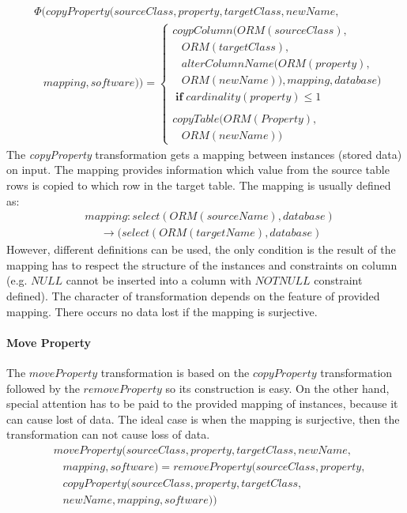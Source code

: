 \documentclass[runningheads]{comsis}
\begin{document}
\begin{align}
& \Phi(copyProperty(sourceClass, property, targetClass, newName, \nonumber \\ 
&  \; \; \; mapping, software)) = \begin{cases}
 coypColumn(ORM(sourceClass),  \\ \;\;\; ORM(targetClass),  \\ \;\;\;alterColumnName(ORM(property), \\ \;\;\; ORM(newName)), mapping, database) \\ \; \mathbf{if} \; cardinality(property) \leq 1 \\\\
 copyTable(ORM(Property), \\ \;\;\; ORM(newName))
 \end{cases}
\end{align}
The \emph{copyProperty} transformation gets a mapping between instances (stored data) on input. The mapping provides information which value from the source table rows is copied to which row in the target table. The mapping is usually defined as: 
\begin{align}\label{eq:mapping}
&	mapping : select(ORM(sourceName), database) \nonumber \\ 
& \;\;\;\;\; \rightarrow  (select(ORM(targetName), database) 
\end{align}
However, different definitions can be used, the only condition is the result of the mapping has to respect the structure of the instances and constraints on column (e.g. $NULL$ cannot be inserted into a column with $NOTNULL$ constraint defined). The character of transformation depends on the feature of provided mapping. There occurs no data lost if the mapping is surjective.

\paragraph{Move Property}
The $moveProperty$ transformation is based on the $copyProperty$ transformation followed by the $removeProperty$ so its construction is easy. On the other hand, special attention has to be paid to the provided mapping of instances, because it can cause lost of data. The ideal case is when the mapping is surjective, then the transformation can not cause loss of data. %
\begin{align}
& moveProperty(sourceClass, property, targetClass, newName,\nonumber  \\
& \;\;\; mapping, software) = removeProperty(sourceClass, property, \nonumber \\
& \;\;\; copyProperty(sourceClass, property, targetClass, \nonumber \\ 
& \;\;\;newName, mapping, software))
\end{align}
\end{document}

